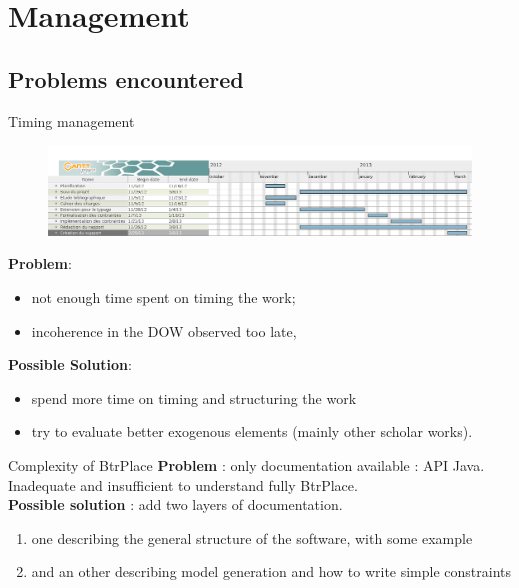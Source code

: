 \documentclass{beamer}
\begin{document}
\section{Management}
\subsection{Problems encountered}
\begin{frame}{Timing management}
\begin{figure}[!ht]
	\includegraphics[scale=.2]{imgs/gantt2.png}
\end{figure}
\textbf{Problem}:
\begin{itemize}
	\item not enough time spent on timing the work; 
	\item incoherence in the DOW observed too late, %
\end{itemize}
\textbf{Possible Solution}:
\begin{itemize}
	\item spend more time on timing and structuring the work %
	\item try to evaluate better exogenous elements (mainly other scholar works).
\end{itemize}
\end{frame}

\begin{frame}{Complexity of BtrPlace}
\textbf{Problem} : only documentation available : API Java.
Inadequate and insufficient to understand fully BtrPlace.\\
\textbf{Possible solution} : add two layers of documentation.
\begin{enumerate}
	\item one describing the general structure of the software, with
		some example
	\item and an other describing model generation and how to
		write simple constraints
\end{enumerate}
\end{frame}
\end{document}
